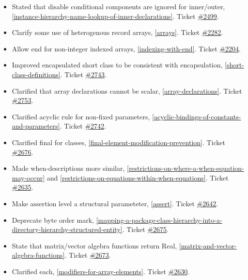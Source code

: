 \begin{itemize}
\item Stated that disable conditional components are ignored for inner/outer, \cref{instance-hierarchy-name-lookup-of-inner-declarations}.
Ticket \href{https://github.com/modelica/ModelicaSpecification/issues/2499}{\#2499}.
\item Clarify some use of heterogenous record arrays, \cref{arrays}.
Ticket \href{https://github.com/modelica/ModelicaSpecification/issues/2282}{\#2282}.
\item Allow end for non-integer indexed arrays, \cref{indexing-with-end}.
Ticket \href{https://github.com/modelica/ModelicaSpecification/issues/2204}{\#2204}.
\item Improved encapsulated short class to be consistent with encapsulation, \cref{short-class-definitions}.
Ticket \href{https://github.com/modelica/ModelicaSpecification/issues/2743}{\#2743}.
\item Clarified that array declarations cannot be scalar, \cref{array-declarations}.
Ticket \href{https://github.com/modelica/ModelicaSpecification/pull/2753}{\#2753}.
\item Clarified acyclic rule for non-fixed parameters, \cref{acyclic-bindings-of-constants-and-parameters}.
Ticket \href{https://github.com/modelica/ModelicaSpecification/pull/2742}{\#2742}.
\item Clarified final for classes, \cref{final-element-modification-prevention}.
Ticket \href{https://github.com/modelica/ModelicaSpecification/issues/2676}{\#2676}.
\item Made when-descriptions more similar, \cref{restrictions-on-where-a-when-equation-may-occur} and \cref{restrictions-on-equations-within-when-equations}.
Ticket \href{https://github.com/modelica/ModelicaSpecification/issues/2635}{\#2635}.
\item Make assertion level a structural parameteter, \cref{assert}.
Ticket \href{https://github.com/modelica/ModelicaSpecification/issues/2642}{\#2642}.
\item Deprecate byte order mark, \cref{mapping-a-package-class-hierarchy-into-a-directory-hierarchy-structured-entity}.
Ticket \href{https://github.com/modelica/ModelicaSpecification/issues/2675}{\#2675}.
\item State that matrix/vector algebra functions return Real, \cref{matrix-and-vector-algebra-functions}.
Ticket \href{https://github.com/modelica/ModelicaSpecification/pull/2673}{\#2673}.
\item Clarified each, \cref{modifiers-for-array-elements}.
Ticket \href{https://github.com/modelica/ModelicaSpecification/issues/2630}{\#2630}.

\end{itemize}
